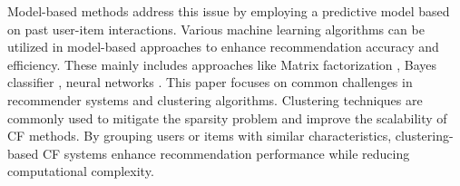 \documentclass{article}
\begin{document}
Model-based methods address this issue by employing a predictive model  based on past user-item interactions. Various machine learning algorithms can be utilized in model-based approaches to enhance recommendation accuracy and efficiency. These mainly includes approaches like Matrix factorization \cite{isinkaye2023matrix,shi2020user,yang2018enhancing, behera2023mixed}, Bayes classifier \cite{valdiviezo2019collaborative}, neural networks \cite{wang2015collaborative,angel2022deep,li2017collaborative}.
This paper focuses on common challenges in recommender systems and clustering algorithms. Clustering techniques are commonly used to mitigate the sparsity problem and improve the scalability of CF methods. By grouping users or items with similar characteristics, clustering-based CF systems enhance recommendation performance while reducing computational complexity. 
\end{document}
